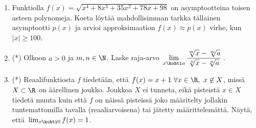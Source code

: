 \begin{enumerate}
\item
Funktiolla $f(x)=\sqrt{x^4+8x^3+35x^2+78x+98}$ on asymptootteina toisen asteen polynomeja. 
Koeta löytää mahdollisimman tarkka tällainen asymptootti $p(x)$ ja arvioi approksimaation 
$f(x)\approx p(x)$ virhe, kun $|x|\ge 100$.

\item (*)
Olkoon $a>0$ ja $m,n\in\N$. Laske raja-arvo
$\displaystyle{\,\lim_{x \kohti a} \frac{\sqrt[m]{x}-\sqrt[m]{a}}{\sqrt[n]{x}-\sqrt[n]{a}}\,}$.

\item (*) Reaalifunktiosta $f$ tiedetään, että $f(x)=x+1\ \forall x\in\R,\ x \not\in X$, missä
$X\subset\R$ on äärellinen joukko. Joukkoa $X$ ei tunneta, eikä pisteistä $x \in X$ tiedetä
muuta kuin että $f$ on näissä pisteissä joko määritelty jollakin tuntemattomilla tavalla
(reaaliarvoisena) tai jätetty määrittelemättä. Näytä, että $\,\lim_{x \kohti 0} f(x)=1$.

\end{enumerate}